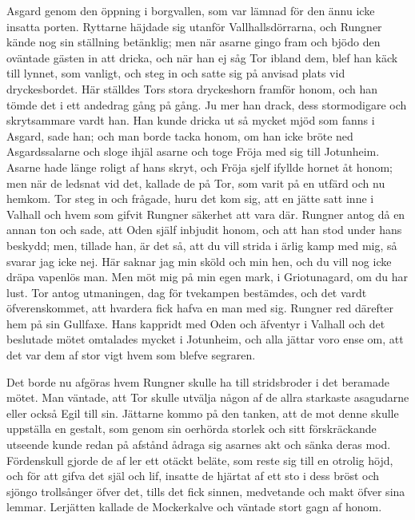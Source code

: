 Asgard genom den öppning i borgvallen, som var lämnad för den ännu icke
insatta porten. Ryttarne häjdade sig utanför Vallhallsdörrarna, och
Rungner kände nog sin ställning betänklig; men när asarne gingo fram och
bjödo den oväntade gästen in att dricka, och när han ej såg Tor ibland
dem, blef han käck till lynnet, som vanligt, och steg in och satte sig
på anvisad plats vid dryckesbordet. Här ställdes Tors stora dryckeshorn
framför honom, och han tömde det i ett andedrag gång på gång. Ju mer han
drack, dess stormodigare och skrytsammare vardt han. Han kunde dricka ut
så mycket mjöd som fanns i Asgard, sade han; och man borde tacka honom,
om han icke bröte ned Asgardssalarne och sloge ihjäl asarne och toge
Fröja med sig till Jotunheim. Asarne hade länge roligt af hans skryt,
och Fröja sjelf ifyllde hornet åt honom; men när de ledsnat vid det,
kallade de på Tor, som varit på en utfärd och nu hemkom. Tor steg in och
frågade, huru det kom sig, att en jätte satt inne i Valhall och hvem som
gifvit Rungner säkerhet att vara där. Rungner antog då en annan ton och
sade, att Oden själf inbjudit honom, och att han stod under hans
beskydd; men, tillade han, är det så, att du vill strida i ärlig kamp
med mig, så svarar jag icke nej. Här saknar jag min sköld och min hen,
och du vill nog icke dräpa vapenlös man. Men möt mig på min egen mark, i
Griotunagard, om du har lust. Tor antog utmaningen, dag för tvekampen
bestämdes, och det vardt öfverenskommet, att hvardera fick hafva en man
med sig. Rungner red därefter hem på sin Gullfaxe. Hans kappridt med
Oden och äfventyr i Valhall och det beslutade mötet omtalades mycket i
Jotunheim, och alla jättar voro ense om, att det var dem af stor vigt
hvem som blefve segraren.

Det borde nu afgöras hvem Rungner skulle ha till stridsbroder i det
beramade mötet. Man väntade, att Tor skulle utvälja någon af de allra
starkaste asagudarne eller också Egil till sin. Jättarne kommo på den
tanken, att de mot denne skulle uppställa en gestalt, som genom sin
oerhörda storlek och sitt förskräckande utseende kunde redan på
afstånd
ådraga sig asarnes akt och sänka deras mod. Fördenskull gjorde de af ler
ett otäckt beläte, som reste sig till en otrolig höjd, och för att gifva
det själ och lif, insatte de hjärtat af ett sto i dess bröst och sjöngo
trollsånger öfver det, tills det fick sinnen, medvetande och makt öfver
sina lemmar. Lerjätten kallade de Mockerkalve och väntade stort gagn af
honom.

